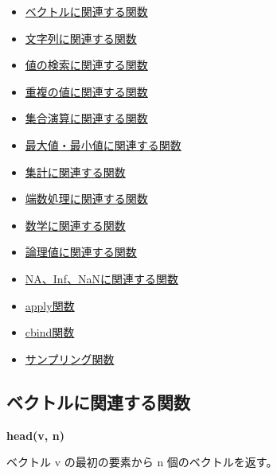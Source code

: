 \documentclass[]{book}
\providecommand{\tightlist}{%
  \setlength{\itemsep}{0pt}\setlength{\parskip}{0pt}}
\begin{document}
\begin{itemize}
\tightlist
\item
  \protect\hyperlink{ux30d9ux30afux30c8ux30ebux306bux95a2ux9023ux3059ux308bux95a2ux6570}{ベクトルに関連する関数}
\item
  \protect\hyperlink{ux6587ux5b57ux5217ux306bux95a2ux9023ux3059ux308bux95a2ux6570}{文字列に関連する関数}
\item
  \protect\hyperlink{ux5024ux306eux691cux7d22ux306bux95a2ux9023ux3059ux308bux95a2ux6570}{値の検索に関連する関数}
\item
  \protect\hyperlink{ux91cdux8907ux306eux5024ux306bux95a2ux9023ux3059ux308bux95a2ux6570}{重複の値に関連する関数}
\item
  \protect\hyperlink{ux96c6ux5408ux6f14ux7b97ux306bux95a2ux9023ux3059ux308bux95a2ux6570}{集合演算に関連する関数}
\item
  \protect\hyperlink{ux6700ux5927ux5024ux30fbux6700ux5c0fux5024ux306bux95a2ux9023ux3059ux308bux95a2ux6570}{最大値・最小値に関連する関数}
\item
  \protect\hyperlink{ux96c6ux8a08ux306bux95a2ux9023ux3059ux308bux95a2ux6570}{集計に関連する関数}
\item
  \protect\hyperlink{ux7aefux6570ux51e6ux7406ux306bux95a2ux9023ux3059ux308bux95a2ux6570}{端数処理に関連する関数}
\item
  \protect\hyperlink{ux6570ux5b66ux306bux95a2ux9023ux3059ux308bux95a2ux6570}{数学に関連する関数}
\item
  \protect\hyperlink{ux8ad6ux7406ux5024ux306bux95a2ux9023ux3059ux308bux95a2ux6570}{論理値に関連する関数}
\item
  \protect\hyperlink{NAux3001Infux3001NaNux306bux95a2ux9023ux3059ux308bux95a2ux6570}{NA、Inf、NaNに関連する関数}
\item
  \protect\hyperlink{applyux95a2ux6570}{apply関数}
\item
  \protect\hyperlink{cbindux95a2ux6570}{cbind関数}
\item
  \protect\hyperlink{ux30b5ux30f3ux30d7ux30eaux30f3ux30b0ux95a2ux6570}{サンプリング関数}
\end{itemize}

\subsection{ベクトルに関連する関数}

\textbf{head(v, n)}

ベクトル v の最初の要素から n 個のベクトルを返す。
\end{document}
